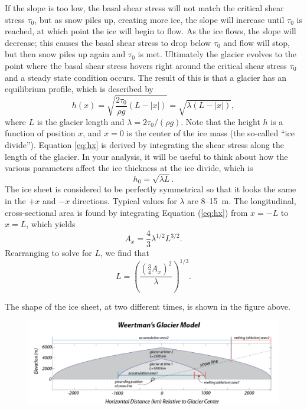 \documentclass[11pt,letterpaper]{article}
\begin{document}
If the slope is too low, the basal shear stress will not match the critical shear stress $\tau_0$, but as snow piles up, creating more ice, the slope will increase until $\tau_0$ is reached, at which point the ice will begin to flow. As the ice flows, the slope will decrease; this causes the basal shear stress to drop below $\tau_0$ and flow will stop, but then snow piles up again and $\tau_0$ is met. Ultimately the glacier evolves to the point where the basal shear stress hovers right around the critical shear stress $\tau_0$ and a steady state condition occurs. The result of this is that a glacier has an equilibrium profile, which is described by 
\begin{equation}
h(x) =  \sqrt{\frac{2\tau_0}{\rho g}(L-|x|)} = \sqrt{\lambda(L-|x|)},
\label{eq:hx}
\end{equation}
where $L$ is the glacier length and $\lambda=2\tau_0/(\rho g)$. Note that the height $h$ is a function of position $x$, and $x=0$ is the center of the ice mass (the so-called ``ice divide''). Equation \ref{eq:hx} is derived by integrating the shear stress along the length of the glacier. In your analysis, it will be useful to think about how the various parameters affect the ice thickness at the ice divide, which is
\begin{equation}
h_0 = \sqrt{\lambda L}.
\end{equation}
The ice sheet is considered to be perfectly symmetrical so that it looks the same in the $+x$ and $-x$ directions. Typical values for $\lambda$ are 8--15~m. The longitudinal, cross-sectional area is found by integrating Equation (\ref{eq:hx}) from $x=-L$ to $x=L$, which yields
\begin{equation}
A_x = \frac{4}{3}\lambda^{1/2}L^{3/2}.
\label{eq:Ax}
\end{equation}
Rearranging to solve for $L$, we find that
\begin{equation}
L = \left(\frac{\left(\frac{3}{4}A_x\right)^2}{\lambda}\right)^{1/3}.
\label{eq:L}
\end{equation}

The shape of the ice sheet, at two different times, is shown in the figure above.
\begin{figure}
\begin{center}
\includegraphics[width=\textwidth]{./weertmans_glacier_model_v2.png}
\end{center}
\label{fig:weertman}
\end{figure}
\end{document}
